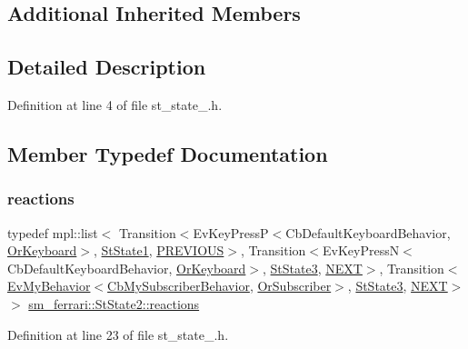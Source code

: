 \subsection*{Additional Inherited Members}


\subsection{Detailed Description}


Definition at line 4 of file st\+\_\+state\+\_.\+h.



\subsection{Member Typedef Documentation}
\mbox{\label{structsm__ferrari_1_1StState2_aa8b58bdd5dffaa1e89dd7adfde215ab4}} 
\subsubsection{\texorpdfstring{reactions}{reactions}}
{\footnotesize\ttfamily typedef mpl\+::list$<$ Transition$<$Ev\+Key\+PressP$<$Cb\+Default\+Keyboard\+Behavior, \hyperlink{classsm__ferrari_1_1OrKeyboard}{Or\+Keyboard}$>$, \hyperlink{structsm__ferrari_1_1StState1}{St\+State1}, \hyperlink{structsm__ferrari_1_1StState2_1_1PREVIOUS}{P\+R\+E\+V\+I\+O\+US}$>$, Transition$<$Ev\+Key\+PressN$<$Cb\+Default\+Keyboard\+Behavior, \hyperlink{classsm__ferrari_1_1OrKeyboard}{Or\+Keyboard}$>$, \hyperlink{structsm__ferrari_1_1StState3}{St\+State3}, \hyperlink{structsm__ferrari_1_1StState2_1_1NEXT}{N\+E\+XT}$>$, Transition$<$\hyperlink{structsm__ferrari_1_1cl__subscriber_1_1EvMyBehavior}{Ev\+My\+Behavior}$<$\hyperlink{classsm__ferrari_1_1cl__subscriber_1_1CbMySubscriberBehavior}{Cb\+My\+Subscriber\+Behavior}, \hyperlink{classsm__ferrari_1_1OrSubscriber}{Or\+Subscriber}$>$, \hyperlink{structsm__ferrari_1_1StState3}{St\+State3}, \hyperlink{structsm__ferrari_1_1StState2_1_1NEXT}{N\+E\+XT}$>$ $>$ \hyperlink{structsm__ferrari_1_1StState2_aa8b58bdd5dffaa1e89dd7adfde215ab4}{sm\+\_\+ferrari\+::\+St\+State2\+::reactions}}



Definition at line 23 of file st\+\_\+state\+\_.\+h.



